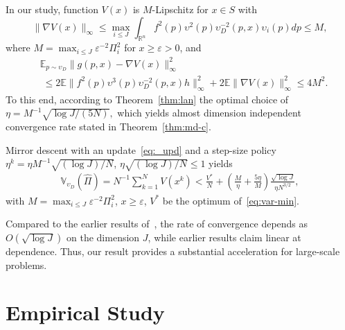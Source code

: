 In our study, function $V(x)$ is $M$-Lipschitz for $x\in S$ with 
$$
\|\nabla V(x)\|_\infty \le \max_{i\le J}\int_{\mathbb{R}^n} f^2(p)\upsilon^2(p)\upsilon^{-2}_D(p,x) \upsilon_i(p) dp \le M, 
$$
where $M = \max_{i\le J}\varepsilon^{-2}\Pi_i^2$ for $x\ge \varepsilon > 0$, and %
\begin{align*}
    & \mathbb{E}_{p\sim \upsilon_D} \|g(p,x) - \nabla V(x)\|_\infty^2 \\
    &\; \le 2\mathbb{E} \|f^2(p)\upsilon^3(p)\upsilon_D^{-2}(p,x) h\|_\infty^2  + 2\mathbb{E} \|\nabla V(x)\|_\infty^2 \le 4 M^2. 
\end{align*}
To this end, according to Theorem~\ref{thm:lan} the optimal choice of 
$\eta = M^{-1}\sqrt{\log J/(5N)},$ which yields almost dimension independent convergence rate stated in Theorem~\ref{thm:md-c}. 
\begin{theorem}\label{thm:md-c} Mirror descent with an update~\eqref{eq:_upd} and a step-size policy $\eta^k \!=\! \eta M^{-1}\!\sqrt{(\log J)/N}$,  $\eta \sqrt{(\log J)/N}\!\le\! 1$ yields
\begin{align*}
    \mathbb{V}_{\upsilon_D} (\hat \Pi) = N^{-1}\sum_{k=1}^N V(x^k) < \frac{V^*}{N} +  \left(\frac{M}{\eta}+ \frac{5\eta}{M}\right)\frac{\sqrt{\log J}}{\eta N^{3/2}}, 
\end{align*}
with $M \!= \!\max_{i\le J}\varepsilon^{-2}\Pi_i^2$,  $x\!\ge\! \varepsilon$, $V^*$ be the optimum of~\eqref{eq:var-min}.
\end{theorem}

Compared to the earlier results of~\cite{owen2019importance}, the rate of convergence depends as $O(\sqrt{\log J})$ on the dimension $J$, while earlier results \cite{owen2019importance} claim linear at dependence. Thus, our result provides a substantial acceleration for large-scale problems.  

\section{Empirical Study}\label{sampling:emp}

